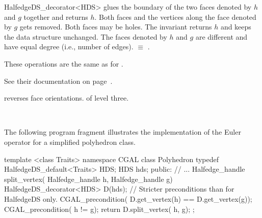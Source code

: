 \begin{ccRefClass}{HalfedgeDS_decorator<HDS>}
   {glues the boundary of the two faces denoted by $h$ and $g$ together 
    and returns $h$. Both faces and the vertices along the face denoted
    by $g$ gets removed. Both faces may be holes. The invariant 
     returns $h$ and keeps the 
    data structure unchanged.
    \ccPrecond The faces denoted by $h$ and $g$ are different and have
    equal degree (i.e., number of edges).
      $\equiv$ 
    .} 



These operations are the same as for 
.
\begin{ccTexOnly}
    See their documentation on page~\pageref{pageHalfedgeDSconstDecoratorRef}.
\end{ccTexOnly}




    {reverses face orientations. \ccPrecond {} of level three.}


\ccSeeAlso

\\

\ccExample

The following program fragment illustrates the implementation of the
Euler operator  for a simplified polyhedron class.

\begin{ccExampleCode}
template <class Traits>
namespace CGAL {
    class Polyhedron {
        typedef HalfedgeDS_default<Traits> HDS;
        HDS hds;
    public:
        // ...
        Halfedge_handle split_vertex( Halfedge_handle h, Halfedge_handle g) {
            HalfedgeDS_decorator<HDS> D(hds);
            // Stricter preconditions than for HalfedgeDS only.
            CGAL_precondition( D.get_vertex(h) == D.get_vertex(g));
            CGAL_precondition( h != g);
            return D.split_vertex( h, g);
        }
    };
}
\end{ccExampleCode}

\end{ccRefClass}

\ccRefPageEnd

